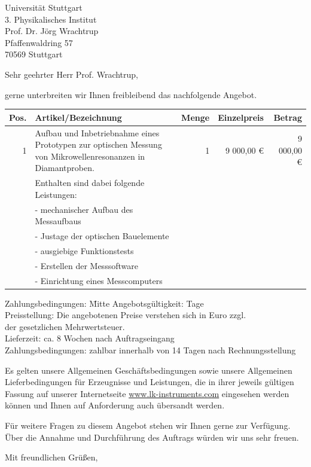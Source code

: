 \documentclass[DIN,
               paper=a4,
               fontsize=11pt,
               addrfield=on,
               enlargefirstpage=on,
               foldmarks=on,
               pagenumber=off,
               firsthead=on,
               firstfoot=on,
               parskip=full,
               addrfield=on,
               fromalign=right,
               fromemail=true,
               fromphone=true,
               fromurl=true,
               fromlogo=on,
               fromrule=off,
               numericaldate=off,
              ]{scrlttr2}
\begin{document}
\begin{letter}{Universität Stuttgart\\
               3. Physikalisches Institut\\
               Prof. Dr. Jörg Wrachtrup\\               
               Pfaffenwaldring 57\\
               70569 Stuttgart}
\opening{Sehr geehrter Herr Prof. Wrachtrup,}
gerne unterbreiten wir Ihnen freibleibend das nachfolgende Angebot.

\begin{tabular}{rp{7.5cm}rrr}
  \toprule
  \textbf{Pos.}&\textbf{Artikel/Bezeichnung}&\textbf{Menge}&\textbf{Einzelpreis}&\textbf{Betrag}\\
  \toprule
  1 & Aufbau und Inbetriebnahme eines Prototypen zur optischen Messung
	    von Mikrowellenresonanzen in Diamantproben. & 1 & 9 000,00 € & 9 000,00 € \\
	  & Enthalten sind dabei folgende Leistungen: & & & \\
	  & - mechanischer Aufbau des Messaufbaus & & & \\
	  & - Justage der optischen Bauelemente & & & \\
	  & - ausgiebige Funktionstests & & & \\
	  & - Erstellen der Messsoftware & & & \\
	  & - Einrichtung eines Messcomputers & & & \\
  \bottomrule
\end{tabular}
\begin{tabbing}
Zahlungsbedingungen: \= Mitte \kill
Angebotsgültigkeit:  Tage\\
Preisstellung:       \>Die angebotenen Preise verstehen sich in Euro zzgl. \\
\> der gesetzlichen Mehrwertsteuer.\\
Lieferzeit:         \>ca. 8 Wochen nach Auftragseingang\\
Zahlungsbedingungen:\> zahlbar innerhalb von 14 Tagen nach Rechnungsstellung\\
\end{tabbing}
Es gelten unsere Allgemeinen Geschäftsbedingungen sowie unsere Allgemeinen Lieferbedingungen für Erzeugnisse und Leistungen, die in ihrer jeweils gültigen Fassung auf unserer Internetseite \href{http://www.lk-instruments.com}{www.lk-instruments.com} eingesehen werden können und Ihnen auf Anforderung auch übersandt werden.

Für weitere Fragen zu diesem Angebot stehen wir Ihnen gerne zur Verfügung.
Über die Annahme und Durchführung des Auftrags würden wir uns sehr freuen.
\closing{Mit freundlichen Grüßen,}


\end{letter}
\end{document}
